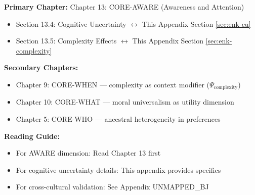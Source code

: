 %
%

%
%
%
%
%

\begin{tcolorbox}[colback=purple!5!white, colframe=purple!75!black,
    title=Chapter Linkage]

\textbf{Primary Chapter:} Chapter 13: CORE-AWARE (Awareness and Attention)
\begin{itemize}[nosep]
\item Section 13.4: Cognitive Uncertainty $\leftrightarrow$ This Appendix Section \ref{sec:enk-cu}
\item Section 13.5: Complexity Effects $\leftrightarrow$ This Appendix Section \ref{sec:enk-complexity}
\end{itemize}

\textbf{Secondary Chapters:}
\begin{itemize}[nosep]
\item Chapter 9: CORE-WHEN --- complexity as context modifier ($\Psi_{\text{complexity}}$)
\item Chapter 10: CORE-WHAT --- moral universalism as utility dimension
\item Chapter 5: CORE-WHO --- ancestral heterogeneity in preferences
\end{itemize}

\textbf{Reading Guide:}
\begin{itemize}[nosep]
\item For AWARE dimension: Read Chapter 13 first
\item For cognitive uncertainty details: This appendix provides specifics
\item For cross-cultural validation: See Appendix UNMAPPED_BJ
\end{itemize}

\end{tcolorbox}


